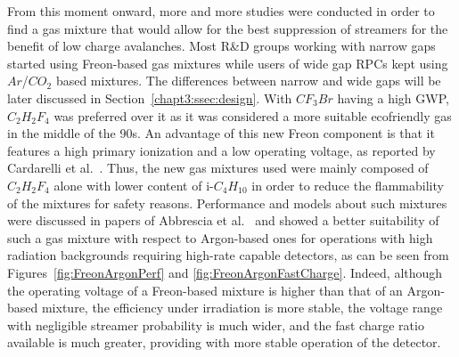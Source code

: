 	From this moment onward, more and more studies were conducted in order to find a gas mixture that would allow for the best suppression of streamers for the benefit of low charge avalanches. Most R\&D groups working with narrow gaps started using Freon-based gas mixtures while users of wide gap RPCs kept using $Ar$/$CO_2$ based mixtures. The differences between narrow and wide gaps will be later discussed in Section~\ref{chapt3:ssec:design}. With $CF_3Br$ having a high GWP, $C_2H_2F_4$ was preferred over it as it was considered a more suitable ecofriendly gas in the middle of the 90s. An advantage of this new Freon component is that it features a high primary ionization and a low operating voltage, as reported by Cardarelli et al.~\cite{CARDARELLI96}. Thus, the new gas mixtures used were mainly composed of $C_2H_2F_4$ alone with lower content of i-$C_4H_{10}$ in order to reduce the flammability of the mixtures for safety reasons. Performance and models about such mixtures were discussed in papers of Abbrescia et al.~\cite{ABBRESCIA1997PERF,ABBRESCIA1997} and showed a better suitability of such a gas mixture with respect to Argon-based ones for operations with high radiation backgrounds requiring high-rate capable detectors, as can be seen from Figures~\ref{fig:FreonArgonPerf} and \ref{fig:FreonArgonFastCharge}. Indeed, although the operating voltage of a Freon-based mixture is higher than that of an Argon-based mixture, the efficiency under irradiation is more stable, the voltage range with negligible streamer probability is much wider, and the fast charge ratio available is much greater, providing with more stable operation of the detector.
	
\endgroup
	
